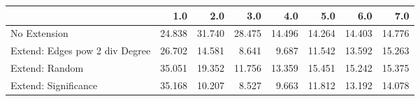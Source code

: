\begin{tabular}{lrrrrrrr}
\toprule
{} &    1.0 &    2.0 &    3.0 &    4.0 &    5.0 &    6.0 &    7.0 \\
\midrule
No Extension                   & 24.838 & 31.740 & 28.475 & 14.496 & 14.264 & 14.403 & 14.776 \\
Extend: Edges pow 2 div Degree & 26.702 & 14.581 &  8.641 &  9.687 & 11.542 & 13.592 & 15.263 \\
Extend: Random                 & 35.051 & 19.352 & 11.756 & 13.359 & 15.451 & 15.242 & 15.375 \\
Extend: Significance           & 35.168 & 10.207 &  8.527 &  9.663 & 11.812 & 13.192 & 14.078 \\
\bottomrule
\end{tabular}
